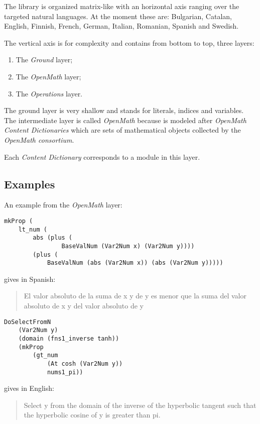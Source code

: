 \documentclass[adraft,copyright,creativecommons]{eptcs}
\begin{document}
The library is organized matrix-like with an horizontal axis ranging over the targeted natural languages.
At the moment these are: Bulgarian, Catalan, English, Finnish, French, German, Italian, Romanian, Spanish and Swedish.

The vertical axis is for complexity and contains from bottom to top, three layers:

\begin{enumerate}
	\item The \emph{Ground} layer;
	\item The \emph{OpenMath} layer;
	\item The \emph{Operations} layer.
\end{enumerate}

The ground layer is very shallow and stands for literals, indices and variables.
The intermediate layer is called \emph{OpenMath} because is modeled after \emph{OpenMath Content Dictionaries} which are sets of mathematical objects collected by the \emph{OpenMath consortium}. 

Each \emph{Content Dictionary} corresponds to a module in this layer.


\subsection{Examples} %
\label{sub:examples}

An example from the \emph{OpenMath} layer:


\begin{lstlisting}
mkProp (
	lt_num (
		abs (plus (
				BaseValNum (Var2Num x) (Var2Num y))))
		(plus (
			BaseValNum (abs (Var2Num x)) (abs (Var2Num y)))))
\end{lstlisting}
gives in Spanish:
\begin{quote}
El valor absoluto de la suma  de x y de y es menor que la suma del valor absoluto  de x y del valor absoluto de y
\end{quote}


\begin{lstlisting}
DoSelectFromN
	(Var2Num y)
	(domain (fns1_inverse tanh))
	(mkProp 
		(gt_num 
			(At cosh (Var2Num y))
			nums1_pi))	
\end{lstlisting}
gives in English:
\begin{quote}
Select y from the domain of the inverse of the hyperbolic tangent such that
the hyperbolic cosine of y is greater than pi.
\end{quote}
\end{document}
